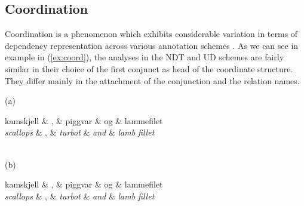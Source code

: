 \documentclass[10pt, a4paper]{article}
\let\w=\emph
\begin{document}
\subsection{Coordination}
Coordination is a phenomenon which exhibits considerable variation in terms
of dependency representation across various annotation schemes \cite{Pop:Mar:Ste:13}.
As we can see in example in (\ref{ex:coord}), the analyses
in the NDT and UD schemes are fairly similar in their choice of
the first conjunct as head of the coordinate structure. They differ
mainly in the attachment of the conjunction and the relation names.

\begin{example}
\label{ex:coord}
(a)\\
    \begin{dependency}
        \begin{deptext}[column sep=.2cm]
          kamskjell \& , \& piggvar \& og \& lammefilet \\
          \w{scallops} \& , \& \w{turbot} \& \w{and} \& \w{lamb fillet}\\
        \end{deptext}
    \end{dependency}
\\(b)\\
    \begin{dependency}
        \begin{deptext}[column sep=.2cm]
          kamskjell \& , \& piggvar \& og \& lammefilet \\
          \w{scallops} \& , \& \w{turbot} \& \w{and} \& \w{lamb fillet}\\
        \end{deptext}
    \end{dependency}
\end{example}
\end{document}
